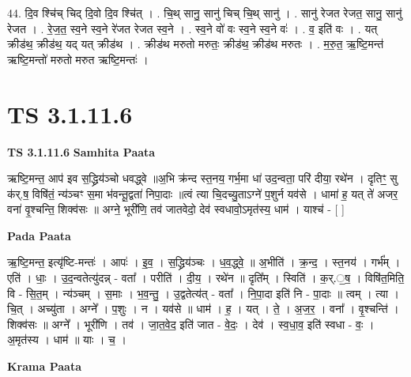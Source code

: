 \documentclass[17pt]{extarticle}
\begin{document}
44. दि॒व श्चि॑च् चिद् दि॒वो दि॒व श्चि॑त् । . चि॒थ् सानु॒ सानु॑ चिच् चि॒थ् सानु॑ । . सानु॑ रेजत रेजत॒ सानु॒ सानु॑ रेजत । . रे॒ज॒त॒ स्व॒ने स्व॒ने रे॑जत रेजत स्व॒ने । . स्व॒ने वो॑ वः स्व॒ने स्व॒ने वः॑ । . व॒ इति॑ वः । . यत् क्रीड॑थ॒ क्रीड॑थ॒ यद् यत् क्रीड॑थ । . क्रीड॑थ मरुतो मरुतः॒ क्रीड॑थ॒ क्रीड॑थ मरुतः । . म॒रु॒त॒ ऋ॒ष्टि॒मन्त॑ ऋष्टि॒मन्तो॑ मरुतो मरुत ऋष्टि॒मन्तः॑ । \newline
\pagebreak
{}

\section{ TS 3.1.11.6 }

\textbf{TS 3.1.11.6 } \newline
\textbf{Samhita Paata} \newline

ऋष्टि॒मन्त॒ आप॑ इव स॒द्ध्रिय॑ञ्चो धवद्ध्वे ॥अ॒भि क्र॑न्द स्त॒नय॒ गर्भ॒मा धा॑ उद॒न्वता॒ परि॑ दीया॒ रथे॑न । दृतिꣳ॒॒ सु क॑र्.ष॒ विषि॑तं॒ न्य॑ञ्चꣳ स॒मा भ॑वन्तू॒द्वता॑ निपा॒दाः ॥त्वं त्या चि॒दच्यु॒ताऽग्ने॑ प॒शुर्न यव॑से । धामा॑ ह॒ यत् ते॑ अजर॒ वना॑ वृ॒श्चन्ति॒ शिक्व॑सः ॥ अग्ने॒ भूरी॑णि॒ तव॑ जातवेदो॒ देव॑ स्वधावो॒ऽमृत॑स्य॒ धाम॑ । याश्च॑ - [  ] \newline

\textbf{Pada Paata} \newline

ऋ॒ष्टि॒मन्त॒ इत्यृ॑ष्टि-मन्तः॑ । आपः॑ । इ॒व॒ । स॒द्ध्रिय॑ञ्चः । ध॒व॒द्ध्वे॒ ॥ अ॒भीति॑ । क्र॒न्द॒ । स्त॒नय॑ । गर्भ᳚म् । एति॑ । धाः॒ । उ॒द॒न्वतेत्यु॑दन्न् - वता᳚ । परीति॑ । दी॒य॒ । रथे॑न ॥ दृति᳚म् । स्विति॑ । क॒र्.॒ष॒ । विषि॑त॒मिति॒ वि - सि॒त॒म् । न्य॑ञ्चम् । स॒माः । भ॒व॒न्तु॒ । उ॒द्वतेत्य॑त् - वता᳚ । नि॒पा॒दा इति॑ नि - पा॒दाः ॥ त्वम् । त्या । चि॒त् । अच्यु॑ता । अग्ने᳚ । प॒शुः । न । यव॑से ॥ धाम॑ । ह॒ । यत् । ते॒ । अ॒ज॒र॒ । वना᳚ । वृ॒श्चन्ति॑ । शिक्व॑सः ॥ अग्ने᳚ । भूरी॑णि । तव॑ । जा॒त॒वे॒द॒ इति॑ जात - वे॒दः॒ । देव॑ । स्व॒धा॒व॒ इति॑ स्वधा - वः॒ । अ॒मृत॑स्य । धाम॑ ॥ याः । च॒ ।  \newline


\textbf{Krama Paata} \newline
\end{document}
